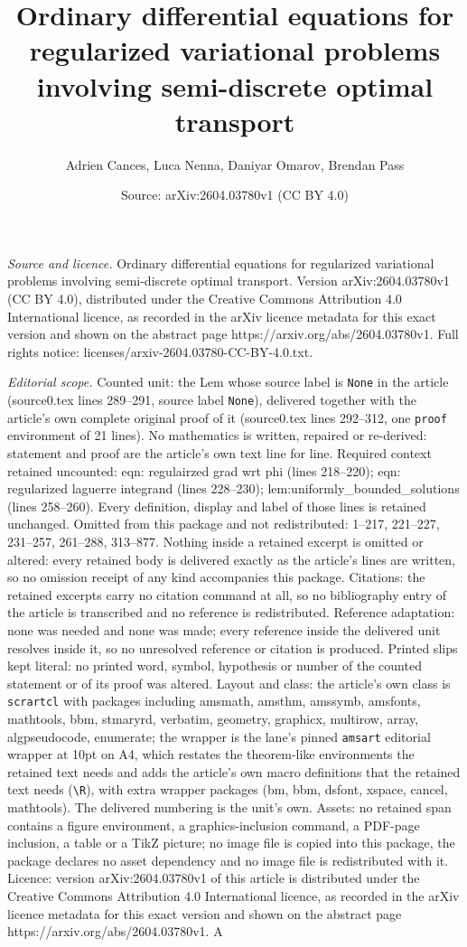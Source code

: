 \documentclass[10pt,a4paper]{amsart}
\title[Ordinary differential equations for regularized variational ]{Ordinary differential equations for regularized variational problems involving semi-discrete optimal transport}
\author{Adrien Cances, Luca Nenna, Daniyar Omarov, Brendan Pass}
\date{Source: arXiv:2604.03780v1 (CC BY 4.0)}
\begin{document}
\maketitle

\noindent\emph{Source and licence.} Ordinary differential equations for regularized variational problems involving semi-discrete optimal transport. Version arXiv:2604.03780v1 (CC BY 4.0), distributed under the Creative Commons Attribution 4.0 International licence, as recorded in the arXiv licence metadata for this exact version and shown on the abstract page https://arxiv.org/abs/2604.03780v1. Full rights notice: licenses/arxiv-2604.03780-CC-BY-4.0.txt.\par\smallskip

\noindent\textit{Editorial scope.} Counted unit: the Lem whose source label is \texttt{None} in the article (source0.tex lines 289--291, source label \texttt{None}), delivered together with the article's own complete original proof of it (source0.tex lines 292--312, one \texttt{proof} environment of 21 lines). No mathematics is written, repaired or re-derived: statement and proof are the article's own text line for line. Required context retained uncounted: eqn: regulairzed grad wrt phi (lines 218--220); eqn: regularized laguerre integrand (lines 228--230); lem:uniformly\_bounded\_solutions (lines 258--260). Every definition, display and label of those lines is retained unchanged. Omitted from this package and not redistributed: 1--217, 221--227, 231--257, 261--288, 313--877. Nothing inside a retained excerpt is omitted or altered: every retained body is delivered exactly as the article's lines are written, so no omission receipt of any kind accompanies this package. Citations: the retained excerpts carry no citation command at all, so no bibliography entry of the article is transcribed and no reference is redistributed. Reference adaptation: none was needed and none was made; every reference inside the delivered unit resolves inside it, so no unresolved reference or citation is produced. Printed slips kept literal: no printed word, symbol, hypothesis or number of the counted statement or of its proof was altered. Layout and class: the article's own class is \texttt{scrartcl} with packages including amsmath, amsthm, amssymb, amsfonts, mathtools, bbm, stmaryrd, verbatim, geometry, graphicx, multirow, array, algpseudocode, enumerate; the wrapper is the lane's pinned \texttt{amsart} editorial wrapper at 10pt on A4, which restates the theorem-like environments the retained text needs and adds the article's own macro definitions that the retained text needs (\texttt{\textbackslash R}), with extra wrapper packages (bm, bbm, dsfont, xspace, cancel, mathtools). The delivered numbering is the unit's own. Assets: no retained span contains a figure environment, a graphics-inclusion command, a PDF-page inclusion, a table or a TikZ picture; no image file is copied into this package, the package declares no asset dependency and no image file is redistributed with it. Licence: version arXiv:2604.03780v1 of this article is distributed under the Creative Commons Attribution 4.0 International licence, as recorded in the arXiv licence metadata for this exact version and shown on the abstract page https://arxiv.org/abs/2604.03780v1. A 
\end{document}
